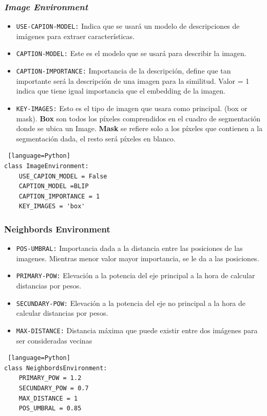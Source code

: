 \subsubsection*{\textit{Image Environment}}
\begin{itemize}
\item \verb|USE-CAPION-MODEL:| Indica que se usar\'a un modelo de descripciones de im\'agenes para extraer caracter\'isticas.
\item \verb|CAPTION-MODEL:| Este es el modelo que se usar\'a para describir la imagen.
\item \verb|CAPTION-IMPORTANCE:| Importancia de la descripci\'on, define que tan importante ser\'a la descripci\'on de una imagen para la similitud. Valor = 1 indica que tiene igual importancia que el embedding de la imagen.
\item \verb|KEY-IMAGES:| Esto es el tipo de imagen que usara como principal. (box or mask). \textbf{Box} son todos los p\'ixeles comprendidos en el cuadro de segmentaci\'on donde se ubica un Image. \textbf{Mask} se refiere solo a los p\'ixeles que contienen a la segmentaci\'on dada, el resto ser\'a p\'ixeles en blanco.
\end{itemize}

\begin{lstlisting} [language=Python]
class ImageEnvironment:
    USE_CAPION_MODEL = False
    CAPTION_MODEL =BLIP
    CAPTION_IMPORTANCE = 1
    KEY_IMAGES = 'box'
\end{lstlisting} 


\subsubsection*{Neighbords Environment}
\begin{itemize}
\item \verb|POS-UMBRAL:| Importancia dada a la distancia entre las posiciones de las imagenes. Mientras menor valor mayor importancia, se le da a las posiciones.
\item \verb|PRIMARY-POW:| Elevaci\'on a la potencia del eje principal a la hora de calcular distancias por pesos.
\item \verb|SECUNDARY-POW:| Elevaci\'on a la potencia del eje no principal a la hora de calcular distancias por pesos.
\item \verb|MAX-DISTANCE:| Distancia m\'axima que puede existir entre dos im\'agenes para ser consideradas vecinas
\end{itemize}

\begin{lstlisting} [language=Python]
class NeighbordsEnvironment:
    PRIMARY_POW = 1.2
    SECUNDARY_POW = 0.7
    MAX_DISTANCE = 1
    POS_UMBRAL = 0.85
\end{lstlisting} 

